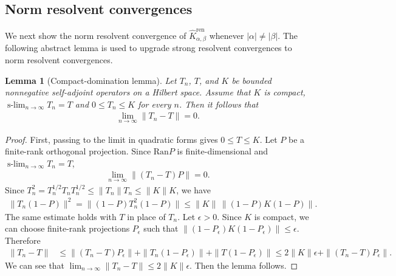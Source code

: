 \documentclass[12pt,dvipdfmx]{article}
\newtheorem{lemma}[theorem]{Lemma}
\newcommand{\Ran}{\mathrm{Ran}}
\begin{document}
\subsection{Norm resolvent convergences}
%
%
We next show the norm resolvent convergence of $\hat{K}_{\alpha,\beta}^\mathrm{ren} $ 
whenever $|\alpha|\ne|\beta|$. 
The following abstract lemma is used to upgrade strong resolvent convergences to 
norm resolvent convergences.
%
\begin{lemma}[Compact-domination lemma]\label{lem:compact_domination}
Let $T_n$, $T$, and $K$ be bounded nonnegative self-adjoint operators on a Hilbert space. Assume that $K$ is compact,
$\operatorname*{s-lim}_{n\to\infty}T_n = T$ and 
$
    0 \le T_n \le K$ 
for every $n$. Then it follows that 
\begin{align*}\lim_{n\to\infty}\|T_n-T\|=0.\end{align*}
\end{lemma}
%
\begin{proof}
First, passing to the limit in quadratic forms gives $0\le T\le K$. Let $P$ be a finite-rank orthogonal projection. Since $\Ran P$ is finite-dimensional and $\operatorname*{s-lim}_{n\to\infty} T_n=T$,
\begin{align*}
    \lim_{n\to\infty} \| (T_n-T)P \| = 0.
\end{align*}
Since
$
    T_n^2 
    = 
    T_n^{1/2} T_n T_n^{1/2} 
    \le 
    \|T_n\| T_n
    \le
    \|K\| K$, 
we have
\begin{align*}
    \|T_n(1-P)\|^2
    =
    \|(1-P)T_n^2(1-P)\|
    \le
    \|K\|\,\|(1-P)K(1-P)\|.
\end{align*}
The same estimate holds with $T$ in place of $T_n$. 
Let $\epsilon>0$. 
Since $K$ is compact, we can choose finite-rank projections $P_\epsilon$ such that
$\|(1-P_\epsilon)K(1-P_\epsilon)\|\leq \epsilon$.  
Therefore
\begin{align*}
    \|T_n-T\|
    &\le
    \|(T_n-T)P_\epsilon\|+\|T_n(1-P_\epsilon)\|+\|T(1-P_\epsilon)\|\leq 2\|K\|\epsilon 
    +\|(T_n-T)P_\epsilon\|.
\end{align*}
We can see that $\lim_{n\to\infty}\|T_n-T\|\leq 2\|K\|\epsilon$. Then the lemma follows. 
\end{proof}
\end{document}
